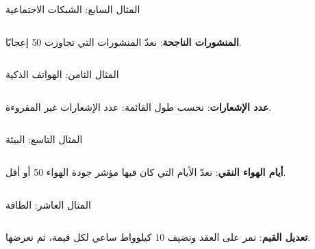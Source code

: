 \documentclass[aspectratio=169, 11pt, t, xcolor={table}]{beamer}
\begin{document}
\begin{frame}[t]{المثال السابع: الشبكات الاجتماعية}
    \begin{columns}[T]
        {\small \textbf{المنشورات الناجحة}: نعدّ المنشورات التي تجاوزت 50 إعجابًا.\par}
        \vspace{0.3cm}
    \end{columns}
\end{frame}

\begin{frame}[t]{المثال الثامن: الهواتف الذكية}
    \begin{columns}[T]
        {\small \textbf{عدد الإشعارات}: نحسب طول القائمة: عدد الإشعارات غير المقروءة.\par}
        \vspace{0.3cm}
    \end{columns}
\end{frame}

\begin{frame}[t]{المثال التاسع: البيئة}
    \begin{columns}[T]
        {\small \textbf{أيام الهواء النقي}: نعدّ الأيام التي كان فيها مؤشر جودة الهواء 50 أو أقل.\par}
        \vspace{0.3cm}
    \end{columns}
\end{frame}

\begin{frame}[t]{المثال العاشر: الطاقة}
    \begin{columns}[T]
        {\small \textbf{تعديل القيم}: نمر على العقد ونضيف 10 كيلوواط ساعي لكل قيمة، ثم نعرضها.\par}
        \vspace{0.3cm}
    \end{columns}
\end{frame}
\end{document}
